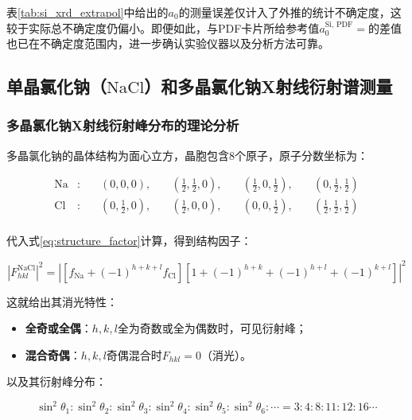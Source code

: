 \documentclass{thuemp}
\begin{document}
表\ref{tab:si_xrd_extrapol}中给出的$a_0$的测量误差仅计入了外推的统计不确定度，这较于实际总不确定度仍偏小。即便如此，与PDF卡片所给参考值$a_0^{\text{Si, PDF}} = $的差值也已在不确定度范围内，进一步确认实验仪器以及分析方法可靠。

\subsection{单晶氯化钠（$\text{NaCl}$）和多晶氯化钠X射线衍射谱测量}

\subsubsection{多晶氯化钠X射线衍射峰分布的理论分析}

多晶氯化钠的晶体结构为面心立方，晶胞包含8个原子，原子分数坐标为：

\begin{align*}
\text{Na} &:
\quad &\left(0,0,0\right),
\quad &\left(\frac{1}{2},\frac{1}{2},0\right),
\quad &\left(\frac{1}{2},0,\frac{1}{2}\right),
\quad &\left(0,\frac{1}{2},\frac{1}{2}\right)\\
\text{Cl} &:
\quad &\left(0,\frac{1}{2},0\right),
\quad &\left(\frac{1}{2},0,0\right),
\quad &\left(0,0,\frac{1}{2}\right),
\quad &\left(\frac{1}{2},\frac{1}{2}, \frac{1}{2}\right) \\
\end{align*}

代入式\ref{eq:structure_factor}计算，得到结构因子：

\begin{equation}
    |F_{hkl}^{\text{NaCl}}|^2 = |\left[f_{\text{Na}}+(-1)^{h+k+l}f_\text{Cl}\right]\left[ 1 + (-1)^{h+k} + (-1)^{h+l} + (-1)^{k+l}\right]|^2
\end{equation}

这就给出其消光特性：

\begin{itemize}
    \item \textbf{全奇或全偶}：$h,k,l$全为奇数或全为偶数时，可见衍射峰；
    \item \textbf{混合奇偶}：$h,k,l$奇偶混合时$F_{hkl}=0$（消光）。
\end{itemize}

以及其衍射峰分布：

\begin{equation}
    \sin^2\theta_1 : \sin^2\theta_2: \sin^2\theta_3 : \sin^2\theta_4 : \sin^2\theta_5 : \sin^2\theta_6 : \cdots =
    3 : 4 : 8 : 11 : 12: 16 \cdots
    \label{eq:nacl_diff_patt}
\end{equation}
\end{document}
